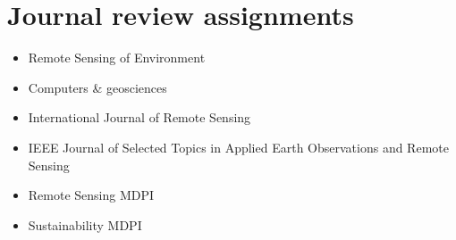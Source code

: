 \documentclass[10pt,a4paper,]{article}
\providecommand{\tightlist}{%
  \setlength{\itemsep}{0pt}\setlength{\parskip}{0pt}}
\newcounter{papers}
\begin{document}
\newrefcontext[sorting=none]\setcounter{papers}{0}\pagebreak[3]
\printbibliography[category=bib-./publications.bib-929987.9,heading=none]\setcounter{papers}{0}

\nocite{Bruckner:2019c,
Maus:2018c,
Maus:2017b}

\section{Journal review assignments}\label{journal-review-assignments}

\begin{itemize}
\tightlist
\item
  Remote Sensing of Environment\\
\item
  Computers \& geosciences\\
\item
  International Journal of Remote Sensing\\
\item
  IEEE Journal of Selected Topics in Applied Earth Observations and
  Remote Sensing\\
\item
  Remote Sensing MDPI\\
\item
  Sustainability MDPI
\end{itemize}
\end{document}
